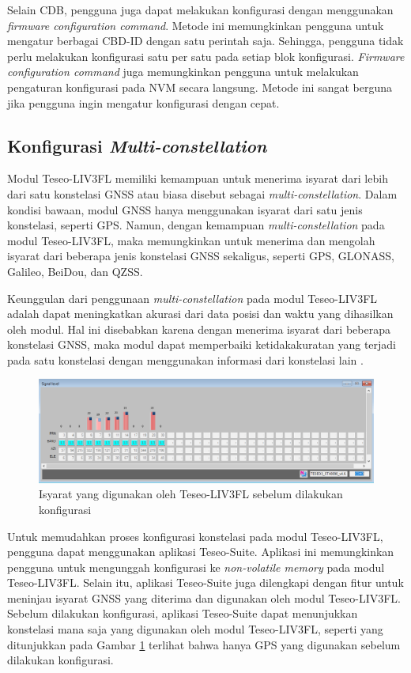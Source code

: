 Selain CDB, pengguna juga dapat melakukan konfigurasi dengan menggunakan \textit{firmware configuration command}. Metode ini memungkinkan pengguna untuk mengatur berbagai CBD-ID dengan satu perintah saja. Sehingga, pengguna tidak perlu melakukan konfigurasi satu per satu pada setiap blok konfigurasi. \textit{Firmware configuration command} juga memungkinkan pengguna untuk melakukan pengaturan konfigurasi pada NVM secara langsung. Metode ini sangat berguna jika pengguna ingin mengatur konfigurasi dengan cepat.

\subsection{Konfigurasi \textit{Multi-constellation}}
Modul Teseo\hyp{}LIV3FL memiliki kemampuan untuk menerima isyarat dari lebih dari satu konstelasi GNSS atau biasa disebut sebagai \textit{multi-constellation}. Dalam kondisi bawaan, modul GNSS hanya menggunakan isyarat dari satu jenis konstelasi, seperti GPS. Namun, dengan kemampuan \textit{multi-constellation} pada modul Teseo\hyp{}LIV3FL, maka memungkinkan untuk menerima dan mengolah isyarat dari beberapa jenis konstelasi GNSS sekaligus, seperti GPS, GLONASS, Galileo, BeiDou, dan QZSS.
 
Keunggulan dari penggunaan \textit{multi-constellation} pada modul Teseo\hyp{}LIV3FL adalah dapat meningkatkan akurasi dari data posisi dan waktu yang dihasilkan oleh modul. Hal ini disebabkan karena dengan menerima isyarat dari beberapa konstelasi GNSS, maka modul dapat memperbaiki ketidakakuratan yang terjadi pada satu konstelasi dengan menggunakan informasi dari konstelasi lain \cite{An2020}.
 
\begin{figure}[H]
	\centering
	\captionsetup{justification=centering}
	\includegraphics[width=14cm]{contents/chapter-3/setting-konstelasi/sebelum-konfigurasi.png}
	\caption{Isyarat yang digunakan oleh Teseo\hyp{}LIV3FL sebelum dilakukan konfigurasi}
	\label{Fig: sebelum-konfigurasi}
\end{figure}

 Untuk memudahkan proses konfigurasi konstelasi pada modul Teseo\hyp{}LIV3FL, pengguna dapat menggunakan aplikasi Teseo-Suite. Aplikasi ini memungkinkan pengguna untuk mengunggah konfigurasi ke \textit{non-volatile memory} pada modul Teseo\hyp{}LIV3FL. Selain itu, aplikasi Teseo-Suite juga dilengkapi dengan fitur untuk meninjau isyarat GNSS yang diterima dan digunakan oleh modul Teseo\hyp{}LIV3FL. Sebelum dilakukan konfigurasi, aplikasi Teseo-Suite dapat menunjukkan konstelasi mana saja yang digunakan oleh modul Teseo\hyp{}LIV3FL, seperti yang ditunjukkan pada Gambar \ref{Fig: sebelum-konfigurasi} terlihat bahwa hanya GPS yang digunakan sebelum dilakukan konfigurasi.
 
